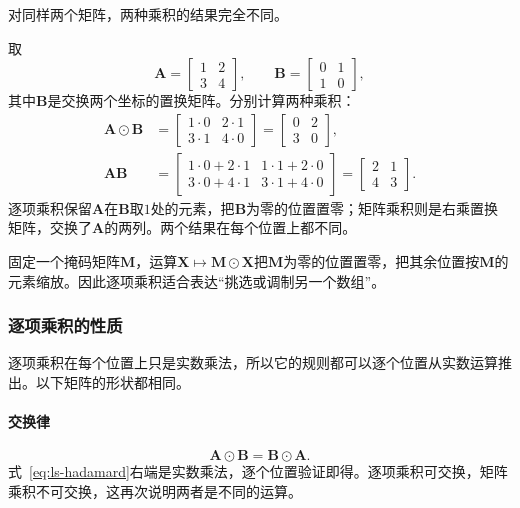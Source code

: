 对同样两个矩阵，两种乘积的结果完全不同。
\begin{example}[逐项乘积与矩阵乘积的对比]
\label{ex:ls-hadamard-vs-matrix-product}
取
\[
\bm A=\begin{bmatrix}1&2\\3&4\end{bmatrix},\qquad
\bm B=\begin{bmatrix}0&1\\1&0\end{bmatrix},
\]
其中$\bm B$是交换两个坐标的置换矩阵。分别计算两种乘积：
\[
 \begin{aligned}
 \bm A\odot\bm B&=\begin{bmatrix}1\cdot0&2\cdot1\\3\cdot1&4\cdot0\end{bmatrix}=\begin{bmatrix}0&2\\3&0\end{bmatrix},\\
 \bm A\bm B&=\begin{bmatrix}1\cdot0+2\cdot1&1\cdot1+2\cdot0\\3\cdot0+4\cdot1&3\cdot1+4\cdot0\end{bmatrix}=\begin{bmatrix}2&1\\4&3\end{bmatrix}.
 \end{aligned}
\]
逐项乘积保留$\bm A$在$\bm B$取$1$处的元素，把$\bm B$为零的位置置零；矩阵乘积则是右乘置换矩阵，交换了$\bm A$的两列。两个结果在每个位置上都不同。
\end{example}
固定一个掩码矩阵$\bm M$，运算$\bm X\mapsto\bm M\odot\bm X$把$\bm M$为零的位置置零，把其余位置按$\bm M$的元素缩放。因此逐项乘积适合表达“挑选或调制另一个数组”。

\subsubsection{逐项乘积的性质}

逐项乘积在每个位置上只是实数乘法，所以它的规则都可以逐个位置从实数运算推出。以下矩阵的形状都相同。

\paragraph{交换律}
\[
 \bm A\odot\bm B=\bm B\odot\bm A.
\]
式~\eqref{eq:ls-hadamard}右端是实数乘法，逐个位置验证即得。逐项乘积可交换，矩阵乘积不可交换，这再次说明两者是不同的运算。


